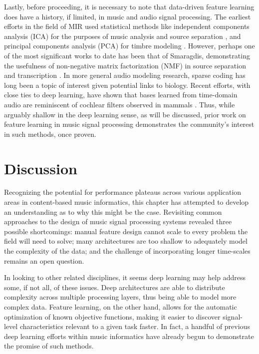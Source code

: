Lastly, before proceeding, it is necessary to note that data-driven feature learning does have a history, if limited, in music and audio signal processing.
The earliest efforts in the field of MIR used statistical methods like independent components analysis (ICA) for the purposes of music analysis and source separation \cite{Plumbley2002Automatic}, and principal components analysis (PCA) for timbre modeling \cite{Jehan2005Creating}.
However, perhaps one of the most significant works to date has been that of Smaragdis, demonstrating the usefulness of non-negative matrix factorization (NMF) in source separation and transcription \cite{Smaragdis2003Nonnegative}.
In more general audio modeling research, sparse coding has long been a topic of interest given potential links to biology.
Recent efforts, with close ties to deep learning, have shown that bases learned from time-domain audio are reminiscent of cochlear filters observed in mammals \cite{Smith2006Efficient}.
Thus, while arguably shallow in the deep learning sense, as will be discussed, prior work on feature learning in music signal processing demonstrates the community's interest in such methods, once proven.


\section{Discussion}
\label{sec:discussion}

Recognizing the potential for performance plateaus across various application areas in content-based music informatics, this chapter has attempted to develop an understanding as to why this might be the case.
Revisiting common approaches to the design of music signal processing systems revealed three possible shortcomings:
manual feature design cannot scale to every problem the field will need to solve;
many architectures are too shallow to adequately model the complexity of the data;
and the challenge of incorporating longer time-scales remains an open question.

In looking to other related disciplines, it seems deep learning may help address some, if not all, of these issues.
Deep architectures are able to distribute complexity across multiple processing layers, thus being able to model more complex data.
Feature learning, on the other hand, allows for the automatic optimization of known objective functions, making it easier to discover signal-level characteristics relevant to a given task faster.
In fact, a handful of previous deep learning efforts within music informatics have already begun to demonstrate the promise of such methods.

